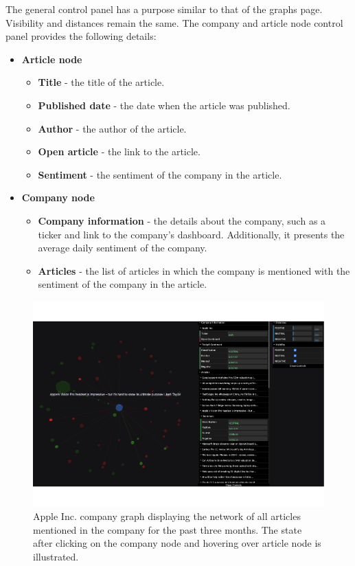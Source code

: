 The general control panel has a purpose similar to that of the graphs page. Visibility and distances remain the same. The company and article node control panel provides the following details:

\begin{itemize}
    \item \textbf{Article node}
    \begin{itemize}
        \item \textbf{Title} - the title of the article.
        \item \textbf{Published date} - the date when the article was published.
        \item \textbf{Author} - the author of the article.
        \item \textbf{Open article} - the link to the article.
        \item \textbf{Sentiment} - the sentiment of the company in the article.
    \end{itemize}
    \item \textbf{Company node}
    \begin{itemize}
        \item \textbf{Company information} - the details about the company, such as a ticker and link to the company's dashboard. Additionally, it presents the average daily sentiment of the company.
        \item \textbf{Articles} - the list of articles in which the company is mentioned with the sentiment of the company in the article.
    \end{itemize}
\end{itemize}

\begin{figure}[hb]
    \centering
    \includegraphics[width=\textwidth]{img/user/apple-company-graph-a.pdf}
    \caption{Apple Inc. company graph displaying the network of all articles mentioned in the company for the past three months. The state after clicking on the company node and hovering over article node is illustrated.}
    \label{fig:user-documentation-company-graph}
\end{figure}
 